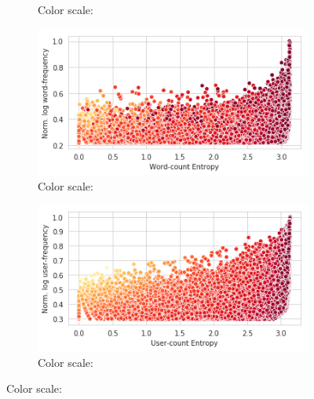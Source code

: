 \begin{figure}[t!]
\begin{subfigure}[t]{0.49\textwidth}
   \caption{Color scale: \wordrank{}}
   \label{fig:word_iv_user_axes}
   \end{subfigure}
   \begin{subfigure}[t]{0.49\textwidth}
   \includegraphics[width=\textwidth]{./images/user_iv_word_axes.png}
   \caption{Color scale: \userrank{}}
   \label{fig:user_iv_word_axes}
   \end{subfigure}
   \begin{subfigure}[t]{0.49\textwidth}
   \includegraphics[width=\textwidth]{./images/user_iv_user_axes.png}
   \caption{Color scale: \userrank{}}
   \label{fig:user_iv_user_axes}
   \end{subfigure}


\end{figure}
